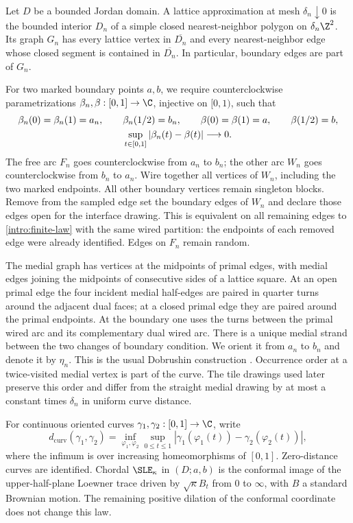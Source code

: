 Let $D$ be a bounded Jordan domain.  A lattice approximation at mesh
$\delta_n\downarrow0$ is the bounded interior $D_n$ of a simple closed
nearest-neighbor polygon on $\delta_n\Z^2$.  Its graph $G_n$ has every
lattice vertex in $\overline{D_n}$ and every nearest-neighbor edge whose
closed segment is contained in $\overline{D_n}$.  In particular, boundary
edges are part of $G_n$.

For two marked boundary points $a,b$, we require counterclockwise
parametrizations $\beta_n,\beta:[0,1]\to\C$, injective on $[0,1)$,
such that
\begin{gather}\label{intro:marked-jordan}
 \beta_n(0)=\beta_n(1)=a_n,\qquad \beta_n(1/2)=b_n,\qquad
 \beta(0)=\beta(1)=a,\qquad \beta(1/2)=b,\\
 \sup_{t\in[0,1]}|\beta_n(t)-\beta(t)|\longrightarrow0.\notag
\end{gather}
The free arc $F_n$ goes counterclockwise from $a_n$ to $b_n$; the other
arc $W_n$ goes counterclockwise from $b_n$ to $a_n$.  Wire together all
vertices of $W_n$, including the two marked endpoints.  All other
boundary vertices remain singleton blocks.  Remove from the sampled edge
set the boundary edges of $W_n$ and declare those edges open for the
interface drawing.  This is equivalent on all remaining edges to
\eqref{intro:finite-law} with the same wired partition: the endpoints of
each removed edge were already identified.  Edges on $F_n$ remain random.

The medial graph has vertices at the midpoints of primal edges, with
medial edges joining the midpoints of consecutive sides of a lattice
square.  At an open primal edge the four incident medial half-edges are
paired in quarter turns around the adjacent dual faces; at a closed
primal edge they are paired around the primal endpoints.  At the
boundary one uses the turns between the primal wired arc and its
complementary dual wired arc.  There is a unique medial strand between
the two changes of boundary condition.  We orient it from $a_n$ to $b_n$
and denote it by $\eta_n$.  This is the usual Dobrushin construction
\citep[Section~5.2.2]{DC2017Lectures}.  Occurrence order at a twice-visited
medial vertex is part of the curve.  The tile drawings used later preserve
this order and differ from the straight medial drawing by at most a
constant times $\delta_n$ in uniform curve distance.

For continuous oriented curves $\gamma_1,\gamma_2:[0,1]\to\C$, write
\begin{equation}\label{intro:curve-metric}
 d_{\mathrm{curv}}(\gamma_1,\gamma_2)
 =\inf_{\varphi_1,\varphi_2}
   \sup_{0\le t\le1}
   |\gamma_1(\varphi_1(t))-\gamma_2(\varphi_2(t))|,
\end{equation}
where the infimum is over increasing homeomorphisms of $[0,1]$.
Zero-distance curves are identified.  Chordal $\SLE_\kappa$ in $(D;a,b)$
is the conformal image of the upper-half-plane Loewner trace driven by
$\sqrt\kappa B_t$ from $0$ to $\infty$, with $B$ a standard Brownian
motion.  The remaining positive dilation of the conformal coordinate
does not change this law.

